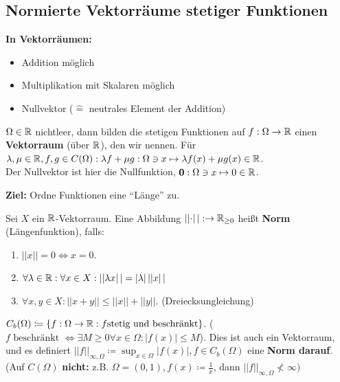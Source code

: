 \subsection{Normierte Vektorräume stetiger Funktionen}
\textbf{In Vektorräumen:}
\begin{itemize}
	\item Addition möglich
	\item Multiplikation mit Skalaren möglich
	\item Nullvektor ($ \hat{=} $ neutrales Element der Addition)
\end{itemize}

$ \Omega \in \mathbb{R}  $ nichtleer, dann bilden die stetigen Funktionen auf $ f: \Omega \to \mathbb{R}  $ einen \textbf{Vektorraum} (über $ \mathbb{R}  $), den wir  nennen. Für $ \lambda, \mu \in \mathbb{R} , f,g \in C(\Omega): \lambda f + \mu g : \Omega \ni x \mapsto \lambda f(x) + \mu g(x) \in \mathbb{R}  $.\\
Der Nullvektor ist hier die Nullfunktion, $ \mathbf{0} : \Omega \ni x \mapsto 0 \in \mathbb{R}  $.

\textbf{Ziel:} Ordne Funktionen eine ``Länge'' zu.
\begin{subdefinition}
	Sei $ X $ ein $ \mathbb{R}  $-Vektorraum. Eine Abbildung $ \left|| \cdot  \right||: \to \mathbb{R} _{\geq 0}  $ heißt \textbf{Norm} (Längenfunktion), falls:
	\begin{enumerate}[label=(\roman*)]
		\item $ \left|| x \right|| = 0 \iff x = 0 $.
		\item $ \forall \lambda \in \mathbb{R} : \forall x \in X : \left|| \lambda x \right|| = \left| \lambda \right| \left|| x \right|| $
		\item $ \forall x,y \in X: \left|| x + y \right|| \leq \left|| x \right|| + \left|| y \right|| $. (Dreiecksungleichung)
	\end{enumerate}
\end{subdefinition}

\begin{subexample}
	$ C_b(\Omega) \coloneqq  \left\{ f: \Omega \to \mathbb{R} : f \text{stetig und beschränkt}  \right\}  $. ($ f \text{ beschränkt } \iff \exists M \geq  0 \forall  x \in  \Omega : | f(x) | \leq M $). Dies ist auch ein Vektorraum, und es definiert $ \left|\left| f \right|\right|_{\infty, \Omega} \coloneqq \sup_{x \in \Omega} | f(x) |, f \in C_b(\Omega) $ eine \textbf{Norm darauf}.
	\begingroup
	\color{blue}
	(Auf $ C(\Omega) $ \textbf{nicht:} z.B. $ \Omega = (0, 1), f(x) \coloneqq \frac{ 1 }{ x }  $, dann $ \left|\left| f \right|\right|_{\infty, \Omega} \nless \infty ) $
	\endgroup
\end{subexample}

